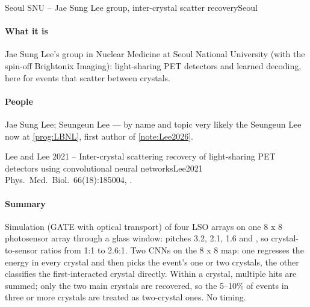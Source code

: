 \begin{programnote}{Seoul SNU -- Jae Sung Lee group, inter-crystal scatter recovery}{Seoul}

\paragraph{What it is}
Jae Sung Lee's group in Nuclear Medicine at Seoul National University (with the
spin-off Brightonix Imaging): light-sharing PET detectors and learned decoding,
here for events that scatter between crystals.

\paragraph{People}
Jae Sung Lee; Seungeun Lee --- by name and topic very likely the Seungeun Lee
now at \ref{prog:LBNL}, first author of \ref{note:Lee2026}.

\begin{papernote}{Lee and Lee 2021 -- Inter-crystal scattering recovery of light-sharing PET detectors using convolutional neural networks}{Lee2021}
Phys.\ Med.\ Biol.\ 66(18):185004, .

\paragraph{Summary}
Simulation (GATE with optical transport) of four  LSO arrays on one
8 x 8 photosensor array through a glass window: pitches 3.2, 2.1, 1.6 and ,
so crystal-to-sensor ratios from 1:1 to 2.6:1. Two CNNs on the 8 x 8 map:
one regresses the energy in every crystal and then picks the event's one or two
crystals, the other classifies the first-interacted crystal directly. Within a
crystal, multiple hits are summed; only the two main crystals are recovered,
so the 5--10\% of events in three or more crystals are treated as two-crystal
ones. No timing.


\end{papernote}
\end{programnote}
